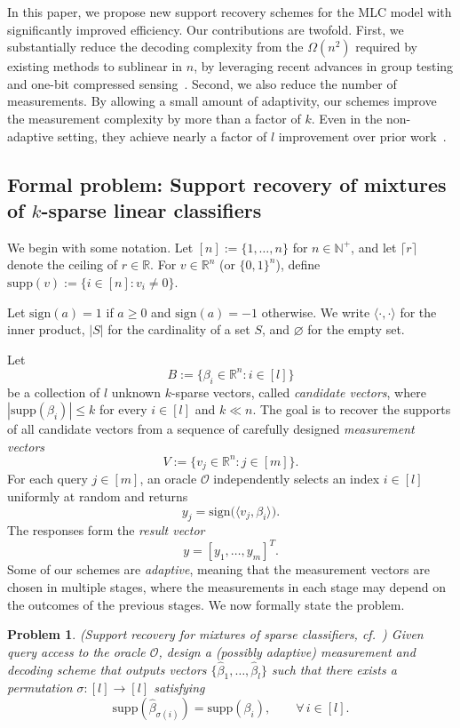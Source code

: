 \documentclass{article}
\newtheorem{problem}{Problem}[section]
\newcommand{\supp}{\mathrm{supp}}
\newcommand{\sign}{\mathrm{sign}}
\begin{document}
In this paper, we propose new support recovery schemes for the MLC model with significantly improved efficiency. Our contributions are twofold. First, we substantially reduce the decoding complexity from the $\Omega(n^2)$ required by existing methods to sublinear in $n$, by leveraging recent advances in group testing and one-bit compressed sensing~\cite{cai2017efficient,price2020fast,lee2019saffron,price2023fast,li2025noisy,li2025support}. Second, we also reduce the number of measurements. By allowing a small amount of adaptivity, our schemes improve the measurement complexity by more than a factor of $k$. Even in the non-adaptive setting, they achieve nearly a factor of $l$ improvement over prior work~\cite{gandikota2020recovery,pal2021support}.

\subsection{Formal problem: Support recovery of mixtures of $k$-sparse linear classifiers}\label{sec:MLCk}

We begin with some notation. Let $[n]:=\{1,\dots,n\}$ for $n\in\mathbb{N}^+$, and let $\lceil r\rceil$ denote the ceiling of $r\in\mathbb{R}$. For $v\in\mathbb{R}^n$ (or $\{0,1\}^n$), define
\(
\supp(v):=\{i\in[n]:v_i\neq0\}.
\)

Let $\sign(a)=1$ if $a\ge0$ and $\sign(a)=-1$ otherwise. We write $\langle\cdot,\cdot\rangle$ for the inner product, $|S|$ for the cardinality of a set $S$, and $\varnothing$ for the empty set.

Let
\[
B:=\{\beta_i\in\mathbb{R}^n:i\in[l]\}
\]
be a collection of $l$ unknown $k$-sparse vectors, called \emph{candidate vectors}, where $|\supp(\beta_i)|\le k$ for every $i\in[l]$ and $k\ll n$. The goal is to recover the supports of all candidate vectors from a sequence of carefully designed \emph{measurement vectors}
\[
V:=\{v_j\in\mathbb{R}^n:j\in[m]\}.
\]
For each query $j\in[m]$, an oracle $\mathcal{O}$ independently selects an index $i\in[l]$ uniformly at random and returns
\[
y_j=\sign\bigl(\langle v_j,\beta_i\rangle\bigr).
\]
The responses form the \emph{result vector}
\[
y=[y_1,\dots,y_m]^T.
\]
Some of our schemes are \emph{adaptive}, meaning that the measurement vectors are chosen in multiple stages, where the measurements in each stage may depend on the outcomes of the previous stages. We now formally state the problem.

\begin{problem}\label{Problem1}
(Support recovery for mixtures of sparse classifiers, cf.~\cite{gandikota2020recovery})
Given query access to the oracle $\mathcal{O}$, design a (possibly adaptive) measurement and decoding scheme that outputs vectors $\{\hat{\beta}_1,\dots,\hat{\beta}_l\}$ such that there exists a permutation $\sigma:[l]\to[l]$ satisfying
\[
\supp(\hat{\beta}_{\sigma(i)})=\supp(\beta_i),
\qquad \forall\, i\in[l].
\]
\end{problem}
\end{document}
